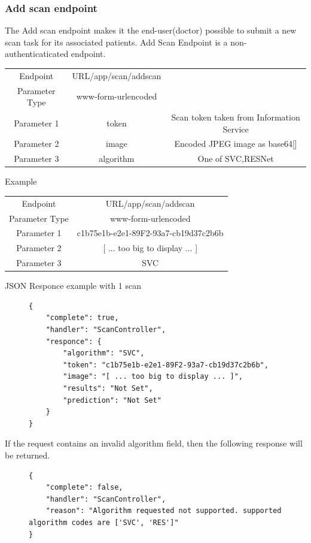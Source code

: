 				\subsubsection{Add scan endpoint}
					\label{add-scan-taskbe}
					The Add scan endpoint makes it the end-user(doctor) possible to submit a new scan task for its associated 
					patients. Add Scan Endpoint is a non-authenticaticated endpoint.
					\begin{center}
						\begin{tabular}{ |c|c|c| } 
							\hline
							Endpoint & {{URL}}/app/scan/addscan& \\
							Parameter Type & www-form-urlencoded  &\\
							Parameter 1 & token  &Scan token taken from Information Service\\
							Parameter 2 & image  &Encoded JPEG image as base64[\cite{base64-4648}]\\
							Parameter 3 & algorithm  & One of {SVC,RESNet}\\
							\hline
						\end{tabular}
					\end{center}
					Example
					\begin{center}
						\begin{tabular}{ |c|c| } 
							\hline
							Endpoint & {{URL}}/app/scan/addscan \\
							Parameter Type & www-form-urlencoded  \\
							Parameter 1 & c1b75e1b-e2e1-89F2-93a7-cb19d37c2b6b   \\
							Parameter 2 & [ ... too big to display ... ]  \\
							Parameter 3 & SVC\\
							\hline
						\end{tabular}
					\end{center}
					JSON Responce example with 1 scan
					\begin{figure}[H]
						\iftrue
						\begin{lstlisting}[]
{
	"complete": true,
	"handler": "ScanController",
	"responce": {
		"algorithm": "SVC",
		"token": "c1b75e1b-e2e1-89F2-93a7-cb19d37c2b6b",
		"image": "[ ... too big to display ... ]",
		"results": "Not Set",
		"prediction": "Not Set"
	}
}
						\end{lstlisting}
					\end{figure}
					If the request contains an invalid algorithm field, then the following response will be returned.
					\begin{figure}[H]
						\iftrue
						\begin{lstlisting}[]
{
	"complete": false,
	"handler": "ScanController",
	"reason": "Algorithm requested not supported. supported algorithm codes are ['SVC', 'RES']"
}
						\end{lstlisting}
					\end{figure}
